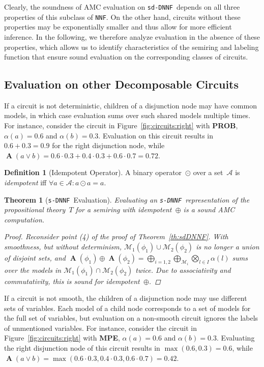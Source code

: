 \documentclass{article}
\theoremstyle{plain}
\newtheorem{theorem}{Theorem}
\theoremstyle{definition}
\newtheorem{definition}{Definition}
\newcommand{\NNF}{{\tt NNF}}
\newcommand{\sDNNF}{{\tt s-DNNF}}
\newcommand{\sdDNNF}{{\tt sd-DNNF}}
\begin{document}
Clearly, the soundness of AMC evaluation on  \sdDNNF\ depends on all three
properties of this subclass of \NNF. On the other hand, circuits without these properties may be exponentially smaller and thus allow
for more efficient inference. 
In the following, we therefore analyze evaluation in the absence of these properties, which allows us to identify characteristics of the semiring and labeling function that ensure sound evaluation on the corresponding classes
of circuits.


\subsection{Evaluation on other Decomposable Circuits}\label{sec:decomposable}
If a circuit is not deterministic, children of a disjunction node may have
common models, in which case evaluation sums over such shared models
multiple times. For instance, consider the circuit in
Figure~\ref{fig:circuits:right} with \textbf{PROB}, $\alpha(a)=0.6$ and
$\alpha(b)=0.3$. Evaluation on this circuit results in $0.6+0.3=0.9$ for
the right disjunction node, while $\operatorname{\mathbf{A}}(a \vee b) = 0.6 \cdot 0.3 +  0.4 \cdot 0.3 + 0.6 \cdot 0.7
= 0.72$.

\begin{definition}[Idempotent Operator]
  A binary operator~$\odot$ over a set~$\mathcal{A}$ is \emph{idempotent} iff $\forall a \in \mathcal{A}: a\odot a=a$.
 \end{definition}

\begin{theorem}[\sDNNF\ Evaluation]\label{th:sDNNF}
 Evaluating an \sDNNF\ representation of the propositional theory~$T$ for a semiring with idempotent~$\oplus$ is a sound AMC computation.
 \begin{proof}
Reconsider point (4) of the proof of Theorem~\ref{th:sdDNNF}. 
With smoothness, but without determinism,
$\mathcal{M}_1(\phi_1)\cup\mathcal{M}_2(\phi_2)$ is no longer a union
of disjoint sets, and $\operatorname{\mathbf{A}}(\phi_1)\oplus
\operatorname{\mathbf{A}}(\phi_2) =
\bigoplus_{i=1,2}\bigoplus_{\mathcal{M}_i}\bigotimes_{l\in
  I}\alpha(l)$ sums over the
models in $\mathcal{M}_1(\phi_1)\cap\mathcal{M}_2(\phi_2)$ twice. 
Due to associativity and commutativity,
   this is sound for idempotent~$\oplus$.
  \end{proof}
\end{theorem}

If a circuit is not smooth, the children of a disjunction node may use
different sets of variables. 
Each model of a child node corresponds to a set of models for the full
set of variables, but evaluation on a non-smooth circuit ignores the labels of unmentioned
variables. For instance, consider the circuit in
Figure~\ref{fig:circuits:right} with \textbf{MPE}, $\alpha(a)=0.6$ and
$\alpha(b)=0.3$. Evaluating the right disjunction node of this circuit results in $\max(0.6,0.3)=0.6$, while $\operatorname{\mathbf{A}}(a \vee b) = \max(0.6 \cdot 0.3, 0.4 \cdot 0.3, 0.6 \cdot 0.7)
= 0.42$.
\end{document}
